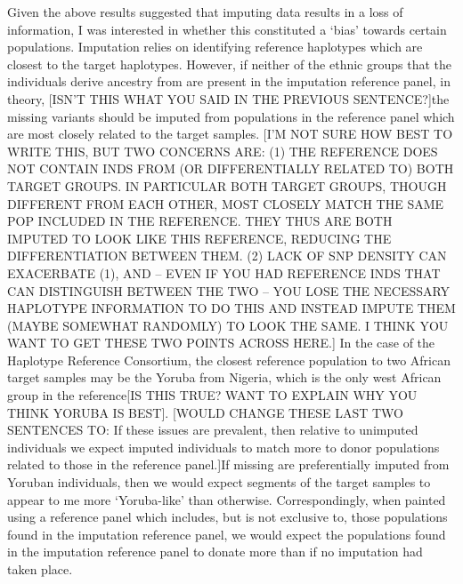 Given the above results suggested that imputing data results in a loss of information, I was interested in whether this constituted a `bias' towards certain populations. Imputation relies on identifying reference haplotypes which are closest to the target haplotypes. However, if neither of the ethnic groups that the individuals derive ancestry from are present in the imputation reference panel, in theory, {\color{red}[ISN'T THIS WHAT YOU SAID IN THE PREVIOUS SENTENCE?]the missing variants should be imputed from populations in the reference panel which are most closely related to the target samples}. {\color{red}[I'M NOT SURE HOW BEST TO WRITE THIS, BUT TWO CONCERNS ARE: (1) THE REFERENCE DOES NOT CONTAIN INDS FROM (OR DIFFERENTIALLY RELATED TO) BOTH TARGET GROUPS. IN PARTICULAR BOTH TARGET GROUPS, THOUGH DIFFERENT FROM EACH OTHER, MOST CLOSELY MATCH THE SAME POP INCLUDED IN THE REFERENCE. THEY THUS ARE BOTH IMPUTED TO LOOK LIKE THIS REFERENCE, REDUCING THE DIFFERENTIATION BETWEEN THEM. (2) LACK OF SNP DENSITY CAN EXACERBATE (1), AND -- EVEN IF YOU HAD REFERENCE INDS THAT CAN DISTINGUISH BETWEEN THE TWO -- YOU LOSE THE NECESSARY HAPLOTYPE INFORMATION TO DO THIS AND INSTEAD IMPUTE THEM (MAYBE SOMEWHAT RANDOMLY) TO LOOK THE SAME. I THINK YOU WANT TO GET THESE TWO POINTS ACROSS HERE.]} In the case of the Haplotype Reference Consortium, the closest reference population to two African target samples may be the Yoruba {\color{red}from Nigeria, which is the only west African group in the reference[IS THIS TRUE? WANT TO EXPLAIN WHY YOU THINK YORUBA IS BEST]}. {\color{red}[WOULD CHANGE THESE LAST TWO SENTENCES TO: If these issues are prevalent, then relative to unimputed individuals we expect imputed individuals to match more to donor populations related to those in the reference panel.]If missing are preferentially imputed from Yoruban individuals, then we would expect segments of the target samples to appear to me more `Yoruba-like' than otherwise. Correspondingly, when painted using a reference panel which includes, but is not exclusive to, those populations found in the imputation reference panel, we would expect the populations found in the imputation reference panel to donate more than if no imputation had taken place.}

